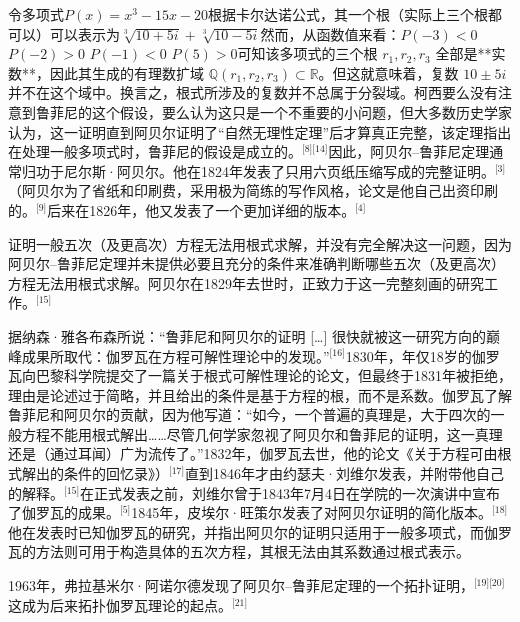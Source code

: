 令多项式$P(x) = x^3 - 15x - 20$根据卡尔达诺公式，其一个根（实际上三个根都可以）可以表示为$\sqrt[3]{10 + 5i} + \sqrt[3]{10 - 5i}$然而，从函数值来看：$P(-3) < 0$ $P(-2) > 0$ $P(-1) < 0$ $P(5) > 0$可知该多项式的三个根 $r_1, r_2, r_3$ 全部是**实数**，因此其生成的有理数扩域 $\mathbb{Q}(r_1, r_2, r_3) \subset \mathbb{R}$。但这就意味着，复数 $10 \pm 5i$ 并不在这个域中。换言之，根式所涉及的复数并不总属于分裂域。柯西要么没有注意到鲁菲尼的这个假设，要么认为这只是一个不重要的小问题，但大多数历史学家认为，这一证明直到阿贝尔证明了“自然无理性定理”后才算真正完整，该定理指出在处理一般多项式时，鲁菲尼的假设是成立的。\(^\text{[8][14]}\)因此，阿贝尔–鲁菲尼定理通常归功于尼尔斯·阿贝尔。他在1824年发表了只用六页纸压缩写成的完整证明。\(^\text{[3]}\)（阿贝尔为了省纸和印刷费，采用极为简练的写作风格，论文是他自己出资印刷的。\(^\text{[9]}\)后来在1826年，他又发表了一个更加详细的版本。\(^\text{[4]}\)

证明一般五次（及更高次）方程无法用根式求解，并没有完全解决这一问题，因为阿贝尔–鲁菲尼定理并未提供必要且充分的条件来准确判断哪些五次（及更高次）方程无法用根式求解。阿贝尔在1829年去世时，正致力于这一完整刻画的研究工作。\(^\text{[15]}\)

据纳森·雅各布森所说：“鲁菲尼和阿贝尔的证明 […] 很快就被这一研究方向的巅峰成果所取代：伽罗瓦在方程可解性理论中的发现。”\(^\text{[16]}\)1830年，年仅18岁的伽罗瓦向巴黎科学院提交了一篇关于根式可解性理论的论文，但最终于1831年被拒绝，理由是论述过于简略，并且给出的条件是基于方程的根，而不是系数。伽罗瓦了解鲁菲尼和阿贝尔的贡献，因为他写道：“如今，一个普遍的真理是，大于四次的一般方程不能用根式解出……尽管几何学家忽视了阿贝尔和鲁菲尼的证明，这一真理还是（通过耳闻）广为流传了。”1832年，伽罗瓦去世，他的论文《关于方程可由根式解出的条件的回忆录》）\(^\text{[17]}\)直到1846年才由约瑟夫·刘维尔发表，并附带他自己的解释。\(^\text{[15]}\)在正式发表之前，刘维尔曾于1843年7月4日在学院的一次演讲中宣布了伽罗瓦的成果。\(^\text{[5]}\)1845年，皮埃尔·旺策尔发表了对阿贝尔证明的简化版本。\(^\text{[18]}\)他在发表时已知伽罗瓦的研究，并指出阿贝尔的证明只适用于一般多项式，而伽罗瓦的方法则可用于构造具体的五次方程，其根无法由其系数通过根式表示。

1963年，弗拉基米尔·阿诺尔德发现了阿贝尔–鲁菲尼定理的一个拓扑证明，\(^\text{[19][20]}\)这成为后来拓扑伽罗瓦理论的起点。\(^\text{[21]}\)
